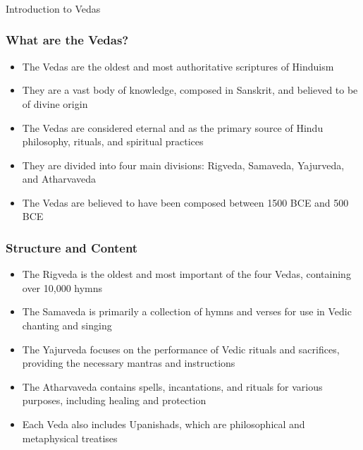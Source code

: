 \begin{frame}[fragile]\frametitle{}
\begin{center}
{\Large Introduction to Vedas}
\end{center}
\end{frame}

\begin{frame}[fragile]\frametitle{What are the Vedas?}
    \begin{itemize}
        \item The Vedas are the oldest and most authoritative scriptures of Hinduism
        \item They are a vast body of knowledge, composed in Sanskrit, and believed to be of divine origin
        \item The Vedas are considered eternal and as the primary source of Hindu philosophy, rituals, and spiritual practices
        \item They are divided into four main divisions: Rigveda, Samaveda, Yajurveda, and Atharvaveda
        \item The Vedas are believed to have been composed between 1500 BCE and 500 BCE
    \end{itemize}
\end{frame}

\begin{frame}[fragile]\frametitle{Structure and Content}
    \begin{itemize}
        \item The Rigveda is the oldest and most important of the four Vedas, containing over 10,000 hymns
        \item The Samaveda is primarily a collection of hymns and verses for use in Vedic chanting and singing
        \item The Yajurveda focuses on the performance of Vedic rituals and sacrifices, providing the necessary mantras and instructions
        \item The Atharvaveda contains spells, incantations, and rituals for various purposes, including healing and protection
        \item Each Veda also includes Upanishads, which are philosophical and metaphysical treatises
    \end{itemize}
\end{frame}

